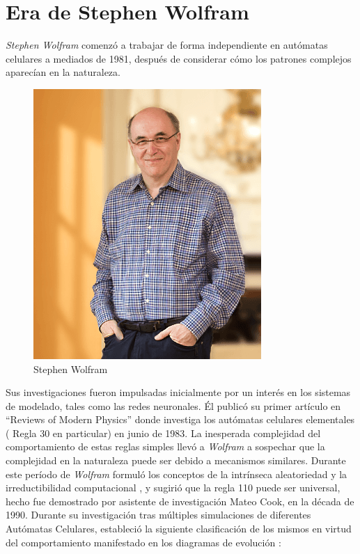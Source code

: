 \section{Era de Stephen Wolfram} %
\textit{Stephen Wolfram} comenzó a trabajar de forma independiente en autómatas celulares a mediados de 1981, después de considerar cómo los patrones complejos aparecían en la naturaleza. 
\begin{figure}
\centering
\includegraphics[scale=0.3]{imagenes/stephen.png}
\caption{Stephen Wolfram}
\label{fig:neumann}
\end{figure}
Sus investigaciones fueron impulsadas inicialmente por un interés en los sistemas de modelado, tales como las redes neuronales. Él publicó su primer artículo en ``Reviews of Modern Physics'' donde investiga los autómatas celulares elementales ( Regla 30 en particular) en junio de 1983. La inesperada complejidad del comportamiento de estas reglas simples llevó a \textit{Wolfram} a sospechar que la complejidad en la naturaleza puede ser debido a mecanismos similares. Durante este período de \textit{Wolfram} formuló los conceptos de la intrínseca aleatoriedad y la irreductibilidad computacional , y sugirió que la regla 110 puede ser universal, hecho fue demostrado por asistente de investigación Mateo Cook, en la década de 1990. Durante su investigación tras múltiples simulaciones de diferentes Autómatas Celulares, estableció la siguiente clasificación de los mismos en virtud del comportamiento manifestado en los diagramas de evolución \cite{wolfram}:
